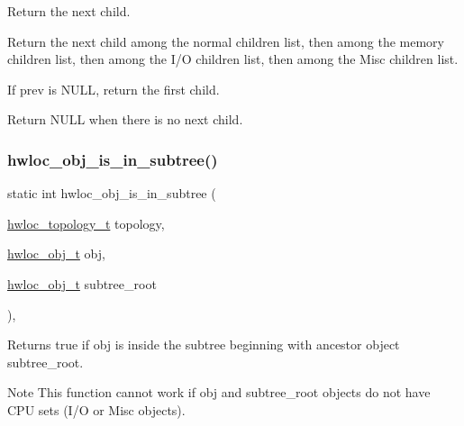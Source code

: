 Return the next child. 

Return the next child among the normal children list, then among the memory children list, then among the I/O children list, then among the Misc children list.

If {\ttfamily prev} is {\ttfamily N\+U\+LL}, return the first child.

Return {\ttfamily N\+U\+LL} when there is no next child. \mbox{\label{a00197_ga408cf74f5bf9ed497911a320c7f8cc56}} 
\subsubsection{\texorpdfstring{hwloc\+\_\+obj\+\_\+is\+\_\+in\+\_\+subtree()}{hwloc\_obj\_is\_in\_subtree()}}
{\footnotesize\ttfamily static int hwloc\+\_\+obj\+\_\+is\+\_\+in\+\_\+subtree (\begin{DoxyParamCaption}\item[{\hyperlink{a00186_ga9d1e76ee15a7dee158b786c30b6a6e38}{hwloc\+\_\+topology\+\_\+t}}]{topology,  }\item[{\hyperlink{a00185_ga79b8ab56877ef99ac59b833203391c7d}{hwloc\+\_\+obj\+\_\+t}}]{obj,  }\item[{\hyperlink{a00185_ga79b8ab56877ef99ac59b833203391c7d}{hwloc\+\_\+obj\+\_\+t}}]{subtree\+\_\+root }\end{DoxyParamCaption})\hspace{0.3cm}{\ttfamily [inline]}, {\ttfamily [static]}}



Returns true if {\ttfamily obj} is inside the subtree beginning with ancestor object {\ttfamily subtree\+\_\+root}. 

\begin{DoxyNote}{Note}
This function cannot work if {\ttfamily obj} and {\ttfamily subtree\+\_\+root} objects do not have C\+PU sets (I/O or Misc objects). 
\end{DoxyNote}
